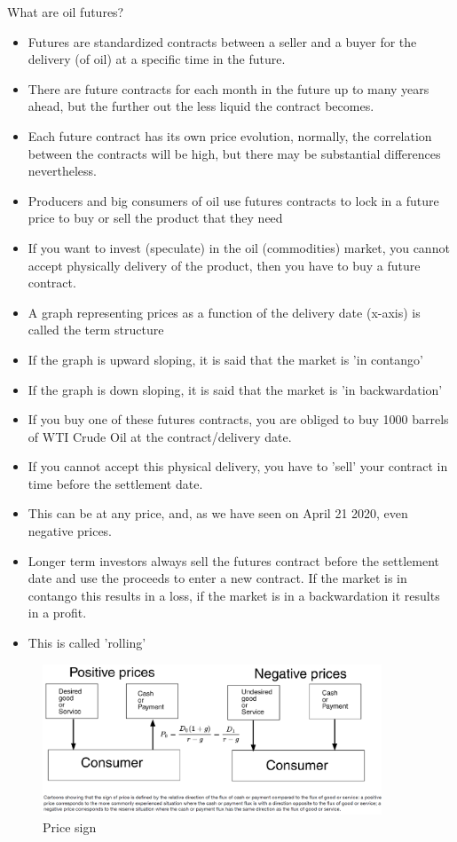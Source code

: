 What are oil futures?
\begin{itemize}
    \item Futures are standardized contracts between a seller and a buyer
        for the delivery (of oil) at a specific time in the future.
    \item There are future contracts for each month in the future up to
        many years ahead, but the further out the less liquid the
        contract becomes.
    \item Each future contract has its own price evolution, normally,
        the correlation between the contracts will be high, but there
        may be substantial differences nevertheless.
    \item Producers and big consumers of oil use futures contracts to lock
        in a future price to buy or sell the product that they need
    \item If you want to invest (speculate) in the oil (commodities) market,
        you cannot accept physically delivery of the product, then you have
        to buy a future contract.
    \item A graph representing prices as a function of the delivery date
        (x-axis) is called the term structure
    \item If the graph is upward sloping, it is said that the market is
        'in contango'
    \item If the graph is down sloping, it is said that the market is 'in
        backwardation'
    \item If you buy one of these futures contracts, you are obliged to buy
        1000 barrels of WTI Crude Oil at the contract/delivery date.
    \item If you cannot accept this physical delivery, you have to 'sell'
        your contract in time before the settlement date.
    \item This can be at any price, and, as we have seen on April 21 2020,
        even negative prices.
    \item Longer term investors always sell the futures contract before
        the settlement date and use the proceeds to enter a new contract.
        If the market is in contango this results in a loss, if the market
        is in a backwardation it results in a profit.
    \item This is called 'rolling'
\end{itemize}

\begin{figure}[h]
    \centering
    \includegraphics[width=0.9\textwidth]{Pictures/Price_sign.png}
    \caption{Price sign}
\end{figure}

